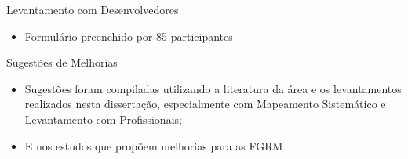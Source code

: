 \documentclass[t,14pt,mathserif]{beamer}
\begin{document}
\begin{frame}{Levantamento com Desenvolvedores}

    \begin{itemize}
        \item Formulário preenchido por 85 participantes
    \end{itemize}

    \begin{table}[htpb]
    \centering
    \caption{Função desempenhada pelos participantes}
    \label{tab:grafico_melhorias_fgrm_funcao_particantes}
    \end{table}

\end{frame}

\begin{frame}{Sugestões de Melhorias}

    \begin{itemize}
        \item Sugestões foram compiladas utilizando a literatura da área e os
            levantamentos realizados nesta dissertação, especialmente com
            Mapeamento Sistemático e Levantamento com Profissionais;
        \item E nos estudos que propõem melhorias para as
            FGRM~\cite{zimmermann2009improving, bettenburg2008makes,
                singh2011bug}.
    \end{itemize}

\end{frame}
\end{document}
